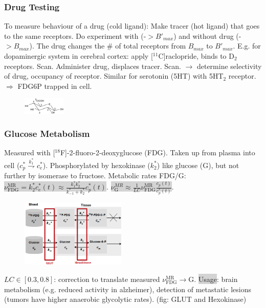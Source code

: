 \documentclass[9pt]{article}
\newcommand{\grey}[1]{\setlength{\fboxsep}{0pt}\colorbox{lightgrey}{#1}}
\begin{document}
\begin{multicols}{2}
\subsubsection{Drug Testing} To measure behaviour of a drug (cold ligand): Make tracer (hot ligand) that goes to the same receptors. Do experiment with (-$>B'_{max}$) and without drug (-$>B_{max}$). The drug changes the \# of total receptors from $B_{max}$ to $B'_{max}$. E.g. for dopaminergic system in cerebral cortex: apply [${}^{11}$C]raclopride, binds to D${}_2$ receptors. Scan. Administer drug, displaces tracer. Scan. $\rightarrow$ determine selectivity of drug, occupancy of receptor. Similar for serotonin (5HT) with 5HT${}_2$ receptor. $\Rightarrow$ FDG6P trapped in cell. 

\begin{figure}
	\vspace{-4mm}
	\includegraphics[width=2cm,]{glucose.png}
\end{figure}
\subsubsection{Glucose Metabolism} Measured with [${}^{18}$F]-2-fluoro-2-deoxyglucose (FDG). Taken up from plasma into cell ($c_p^* \overset{k_1^*}{\rightharpoondown} c_e^*$). Phosphorylated by hexokinase ($k_2^*$) like glucose (G), but not further by isomerase to fructose. 
Metabolic rates FDG/G: \grey{$\nu_\mathrm{FDG}^\mathrm{MR} = k_2^*c_e^*(t) \approx \frac{k_1^*k_2^*}{k_{-1}^*+k_2^*}c_p^*(t)$}.
\grey{$\nu_\mathrm{G}^{MR} \approx \frac{1}{LC} \nu_\mathrm{FDG}^\mathrm{MR} \frac{c_p(t)}{c_p^*(t)}$}.

\begin{figure}
	\vspace{-4mm}
	\includegraphics[width=5cm,]{FDG-Metabolism.png}
\end{figure}
\vspace{-1mm}

$LC\in[0.3,0.8]$: correction to translate measured $\nu_\mathrm{FDG}^\mathrm{MR}\rightarrow$G. \grey{Usage}: brain metabolism (e.g. reduced activity in alzheimer), detection of metastatic lesions (tumors have higher anaerobic glycolytic rates). (fig: GLUT and Hexokinase)


\end{multicols}
\end{document}
